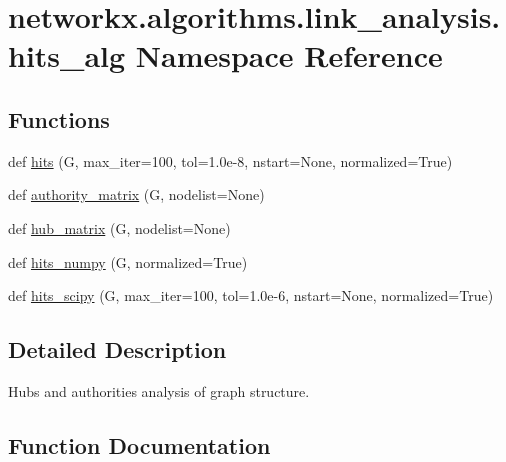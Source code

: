 \hypertarget{namespacenetworkx_1_1algorithms_1_1link__analysis_1_1hits__alg}{}\section{networkx.\+algorithms.\+link\+\_\+analysis.\+hits\+\_\+alg Namespace Reference}
\label{namespacenetworkx_1_1algorithms_1_1link__analysis_1_1hits__alg}
\subsection*{Functions}
\begin{DoxyCompactItemize}
\item 
def \hyperlink{namespacenetworkx_1_1algorithms_1_1link__analysis_1_1hits__alg_a4a207747e9f9b5fb389523c25415ddc1}{hits} (G, max\+\_\+iter=100, tol=1.\+0e-\/8, nstart=\+None, normalized=\+True)
\item 
def \hyperlink{namespacenetworkx_1_1algorithms_1_1link__analysis_1_1hits__alg_a4479709019067c40b62926c528515d5c}{authority\+\_\+matrix} (G, nodelist=None)
\item 
def \hyperlink{namespacenetworkx_1_1algorithms_1_1link__analysis_1_1hits__alg_a9a88378eb91aabf0c7b7fe26a0881ffd}{hub\+\_\+matrix} (G, nodelist=None)
\item 
def \hyperlink{namespacenetworkx_1_1algorithms_1_1link__analysis_1_1hits__alg_a940e4ad55a082f2588ee5e9b23f2275b}{hits\+\_\+numpy} (G, normalized=True)
\item 
def \hyperlink{namespacenetworkx_1_1algorithms_1_1link__analysis_1_1hits__alg_a8433ac63ed595400073ba886ae358a63}{hits\+\_\+scipy} (G, max\+\_\+iter=100, tol=1.\+0e-\/6, nstart=\+None, normalized=\+True)
\end{DoxyCompactItemize}


\subsection{Detailed Description}
\begin{DoxyVerb}Hubs and authorities analysis of graph structure.
\end{DoxyVerb}
 

\subsection{Function Documentation}
\mbox{\label{namespacenetworkx_1_1algorithms_1_1link__analysis_1_1hits__alg_a4479709019067c40b62926c528515d5c}} 
